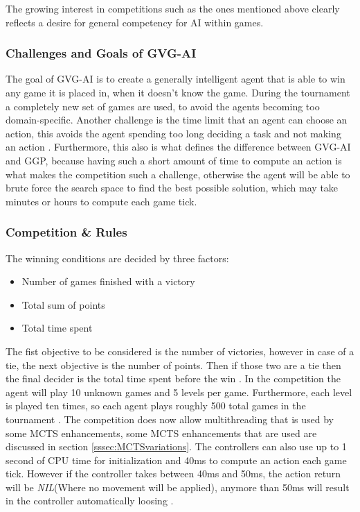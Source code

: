 \documentclass[journal]{IEEEtran}
\begin{document}
		The growing interest in competitions such as the ones mentioned above clearly reflects a desire for general competency for AI within games.



	\subsubsection{Challenges and Goals of GVG-AI}

		The goal of GVG-AI is to create a generally intelligent agent that is able to win any game it is placed in, when it doesn't know the game.
		During the tournament a completely new set of games are used, to avoid the agents becoming too domain-specific.
		Another challenge is the time limit that an agent can choose an action, this avoids the agent spending too long deciding a task and not making an action \cite{schuster2015mcts}. 
		Furthermore, this also is what defines the difference between GVG-AI and GGP, because having such a short amount of time to compute an action is what makes the competition such a challenge, otherwise the agent will be able to brute force the search space to find the best possible solution, which may take minutes or hours to compute each game tick.
		
		

	\subsubsection{Competition \& Rules}
	
		The winning conditions are decided by three factors:
		\begin{itemize}
		    \item Number of games finished with a victory
		    \item Total sum of points
		    \item Total time spent
		\end{itemize}
		The fist objective to be considered is the number of victories, however in case of a tie, the next objective is the number of points. Then if those two are a tie then the final decider is the total time spent before the win \cite{perez20162014}.
		In the competition the agent will play 10 unknown games and 5 levels per game. Furthermore, each level is played ten times, so each agent plays roughly 500 total games in the tournament \cite{schuster2015mcts}.
		The competition does now allow multithreading that is used by some MCTS enhancements, some MCTS enhancements that are used are discussed in section \ref{sssec:MCTSvariations}.
		The controllers can also use up to 1 second of CPU time for initialization and 40ms to compute an action each game tick. However if the controller takes between 40ms and 50ms, the action return will be \textit{NIL}(Where no movement will be applied), anymore than 50ms will result in the controller automatically loosing \cite{horn2016mcts, perez20162014}.
	
\end{document}
